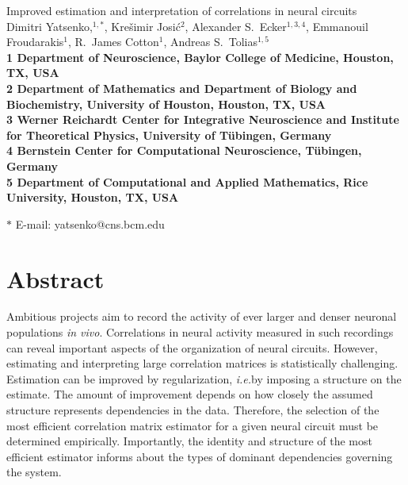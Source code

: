 \documentclass[10pt]{article}
\date{}
\newcommand{\ie}{\emph{i.e.}\;}
\begin{document}
\begin{flushleft}
{\Large
Improved estimation and interpretation of correlations in neural circuits
}
\\
Dimitri Yatsenko,$^{1,\ast}$, 
Kre\v{s}imir Josi\'{c}$^{2}$,
Alexander S.~Ecker$^{1,3,4}$,
Emmanouil Froudarakis$^{1}$,
R.~James Cotton$^{1}$,
Andreas S.~Tolias$^{1,5}$
\\
\bf{1} Department of Neuroscience, Baylor College of Medicine, Houston, TX, USA
\\
\bf{2} Department of Mathematics and Department of Biology and Biochemistry, University of Houston, Houston, TX, USA
\\
\bf{3}  Werner Reichardt Center for Integrative Neuroscience and Institute for Theoretical Physics, University of T\"ubingen, Germany
\\
\bf{4} Bernstein Center for Computational Neuroscience, T\"ubingen, Germany
\\
\bf{5} Department of Computational and Applied Mathematics, Rice University, Houston, TX, USA

$\ast$ E-mail: yatsenko@cns.bcm.edu
\end{flushleft}

\section*{Abstract}
Ambitious projects aim to record the activity of ever larger and denser neuronal populations \emph{in vivo}.  Correlations in neural activity measured in such recordings can reveal important aspects of the organization of neural circuits.  However, estimating and interpreting large correlation matrices is statistically challenging.  Estimation can be improved by regularization, \ie by imposing a structure on the estimate.  The amount of improvement depends on how closely the assumed structure represents dependencies in the data. Therefore, the selection of the most efficient correlation matrix estimator for a given neural circuit must be determined empirically.  Importantly, the identity and structure of the most efficient estimator informs about the types of dominant dependencies governing the system.
\end{document}
